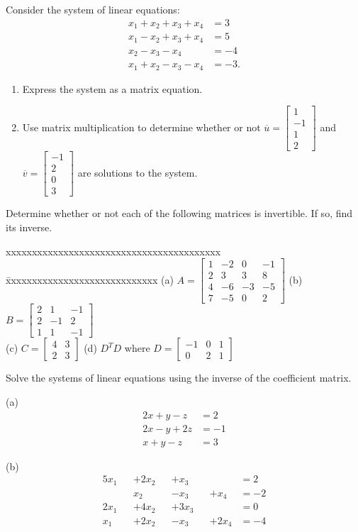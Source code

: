 \documentclass[12pt]{article}
\def\it{\item}
\def\be{\begin{enumerate}} \def\ee{\end{enumerate}}
\def\bar#1{\overline{#1}}
\def\btt{\begin{tabbing}
xxxxxxxxxxxxxxxxxxxxxxxxxxxxxxxxxxxxxxxxx \=
xxxxxxxxxxxxxxxxxxxxxxxxxxxxx \kill}
\def\etb{\end{tabbing}}
\begin{document}
\it Consider the system of linear equations:  
\begin{align*}
x_1 + x_2 + x_3 + x_4 &= 3 \\
x_1 - x_2 + x_3 + x_4 &= 5 \\
      x_2 - x_3 - x_4 &= -4 \\
x_1 + x_2 - x_3 - x_4 &= -3.
\end{align*}
\be
\it Express the system as a matrix equation.
\it Use matrix multiplication to determine whether or not $\bar{u} = \begin{bmatrix} 1 \\ -1 \\ 1 \\ 2 \end{bmatrix}$ and $\bar{v} = \begin{bmatrix} -1 \\ 2 \\ 0 \\ 3 \end{bmatrix}$ are solutions to the system.
\ee

\it Determine whether or not each of the following matrices is invertible. If so, find its inverse. 
\btt
(a) $A = \begin{bmatrix} 1 & -2 & 0 & -1 \\ 2 & 3 & 3 & 8 \\ 4 & -6 & -3 & -5 \\ 7 & -5 & 0 & 2 \end{bmatrix}$ \>
(b) $B = \begin{bmatrix} 2 & 1 & -1 \\ 2 & -1 & 2 \\ 1 & 1 & -1 \end{bmatrix}$ \\[.1in]
(c) $C = \begin{bmatrix} 4 & 3 \\ 2 & 3 \end{bmatrix}$ \>
(d) $D^T D$ where $D = \begin{bmatrix} -1 & 0 & 1 \\ 0 & 2 & 1 \end{bmatrix}$
\etb

\it Solve the systems of linear equations using the inverse of the coefficient matrix. \\
\begin{minipage}[t]{2in}
(a) \begin{align*}
2x + y - z &= 2 \\
2x - y + 2z &= -1 \\
x + y - z &= 3
\end{align*}
\end{minipage}
\begin{minipage}[t]{2in}
(b) \begin{alignat*}{5}
x_1 &&+ 2x_2 &&+ x_3 &&   &= 2 \\
    &&  x_2 &&- x_3 &&+ x_4 &= -2 \\
2x_1 &&+ 4x_2 &&+ 3x_3 &&    &= 0 \\
x_1 &&+ 2x_2 &&- x_3 &&+ 2x_4 & = -4 
\end{alignat*}
\end{minipage}
\end{document}

